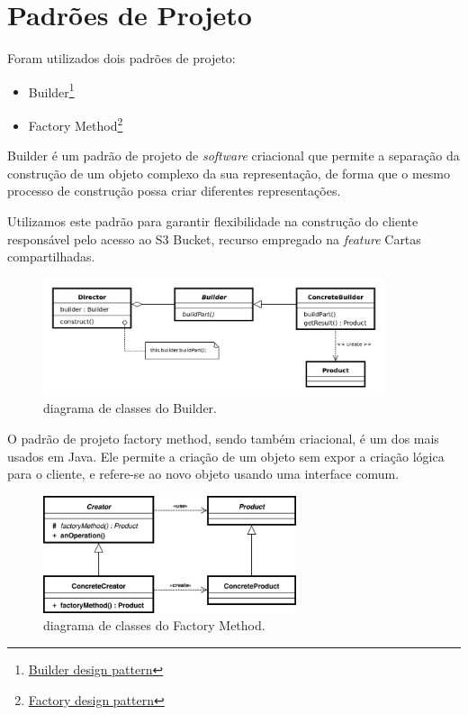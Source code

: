 \documentclass[11pt]{article}
\begin{document}
\section{Padrões de Projeto}
\label{sec:org4fa2e66}
Foram utilizados dois padrões de projeto:
\begin{itemize}
\item Builder\footnote{\href{https://www.geeksforgeeks.org/builder-design-pattern/}{Builder design pattern}}
\item Factory Method\footnote{\href{https://www.tutorialspoint.com/design\_pattern/factory\_pattern.htm}{Factory design pattern}}
\end{itemize}
Builder é um padrão de projeto de \emph{software} criacional que permite a separação da
construção de um objeto complexo da sua representação, de forma que o mesmo processo de
construção possa criar diferentes representações.   

Utilizamos este padrão para garantir flexibilidade na construção do cliente responsável
pelo acesso ao S3 Bucket, recurso empregado na \emph{feature} Cartas compartilhadas.
\begin{figure}[H]
\centering
\includegraphics[height=130px]{./img/builder.png}
\caption{diagrama de classes do Builder.}
\end{figure} 
\pagebreak
O padrão de projeto factory method, sendo também criacional, é um dos mais usados em
Java. Ele permite a criação de um objeto sem expor a criação lógica para o cliente, e
refere-se ao novo objeto usando uma interface comum.
\begin{figure}[H]
\centering
\includegraphics[height=130px]{./img/factory.png}
\caption{diagrama de classes do Factory Method.}
\end{figure} 
\end{document}
